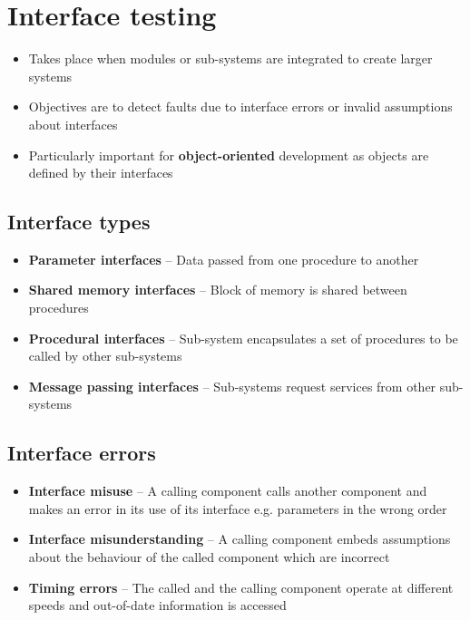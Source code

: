 \documentclass{article}
\begin{document}
\section{Interface testing}

\begin{itemize}
  \item Takes place when modules or sub-systems are integrated to create larger systems 
  \item Objectives are to detect faults due to interface errors or invalid assumptions about interfaces 
  \item Particularly important for \textbf{object-oriented} development as objects are defined by their interfaces
\end{itemize}

\subsection{Interface types}
    
\begin{itemize}
  \item \textbf{Parameter interfaces} – Data passed from one procedure to another 
  \item \textbf{Shared memory interfaces} – Block of memory is shared between procedures 
  \item \textbf{Procedural interfaces} – Sub-system encapsulates a set of procedures to be called by other sub-systems 
  \item \textbf{Message passing interfaces} – Sub-systems request services from other sub-systems
\end{itemize}

\subsection{Interface errors}

\begin{itemize}
  \item \textbf{Interface misuse} – A calling component calls another component and makes an error in its use of its interface e.g. parameters in the wrong order 
  \item \textbf{Interface misunderstanding} – A calling component embeds assumptions about the behaviour of the called component which are incorrect 
  \item \textbf{Timing errors} – The called and the calling component operate at different speeds and out-of-date information is accessed
\end{itemize}
\end{document}
